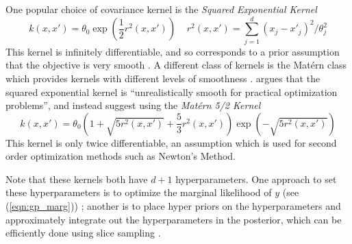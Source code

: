 \documentclass[11pt]{article}
\begin{document}
One popular choice of covariance kernel is the {\it Squared Exponential Kernel}
\begin{equation}
k(x,x') = \theta_0 \exp\left(\frac{1}{2}r^2(x,x')\right) \;\;\;\; r^2(x,x') = \sum_{j=1}^d (x_j - x'_j)^2 / \theta_j^2
\end{equation}
This kernel is infinitely differentiable, and so corresponds to a prior assumption that the objective is very smooth \cite{Rasmussen2004}. A different class of kernels is the Mat\'ern class which provides kernels with different levels of smoothness \cite{Rasmussen2004}. \cite{Snoek2012} argues that the squared exponential kernel is ``unrealistically smooth for practical optimization problems'', and instead suggest using the {\it Mat\'ern 5/2 Kernel}
\begin{equation}
k(x,x') = \theta_0\left(1 + \sqrt{5 r^2(x,x')} + \frac{5}{3}r^2(x,x')\right)\exp\left(-\sqrt{5r^2(x,x')}\right)
\end{equation}
This kernel is only twice differentiable, an assumption which is used for second order optimization methods such as Newton's Method.

Note that these kernels both have $d+1$ hyperparameters. One approach to set these hyperparameters is to optimize the marginal likelihood of $y$ (see (\ref{eqn:gp_marg})) \cite{Rasmussen2004}; another is to place hyper priors on the hyperparameters and approximately integrate out the hyperparameters in the posterior, which can be efficiently done using slice sampling \cite{Snoek2012, Murray2010}.
\end{document}
